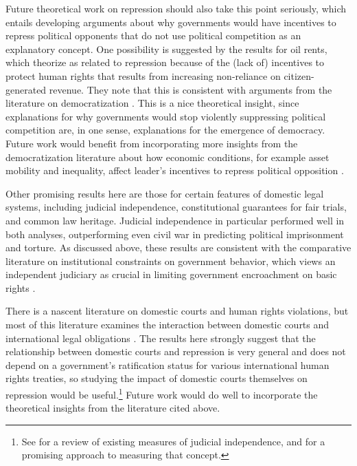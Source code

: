 \documentclass[12pt]{article}
\begin{document}
Future theoretical work on repression should also take this point seriously, which entails developing arguments about why governments would have incentives to repress political opponents that do not use political competition as an explanatory concept. One possibility is suggested by the results for oil rents, which \citet{DemerittYoung2013} theorize as related to repression because of the (lack of) incentives to protect human rights that results from increasing non-reliance on citizen-generated revenue. They note that this is consistent with arguments from the literature on democratization \citep[E.g.][]{Huntington1991,BDMSmith2009}. This is a nice theoretical insight, since explanations for why governments would stop violently suppressing political competition are, in one sense, explanations for the emergence of democracy. Future work would benefit from incorporating more insights from the democratization literature about how economic conditions, for example asset mobility and inequality, affect leader's incentives to repress political opposition \citep[See, e.g.][]{Boix2003,AcemogluRobinson2005,ClarkGolderGolder2013}. 

Other promising results here are those for certain features of domestic legal systems, including judicial independence, constitutional guarantees for fair trials, and common law heritage. Judicial independence in particular performed well in both analyses, outperforming even civil war in predicting political imprisonment and torture. As discussed above, these results are consistent with the comparative literature on institutional constraints on government behavior, which views an independent judiciary as crucial in limiting government encroachment on basic rights \citep[See esp.][]{NorthWeingast1989,Weingast1997,Vanberg2005}. 

There is a nascent literature on domestic courts and human rights violations, but most of this literature examines the interaction between domestic courts and international legal obligations \citep{Hathaway2007,PowellStaton2009,Simmons2009,Conrad2012,ConradRitter2013,Lupu2013}. The results here strongly suggest that the relationship between domestic courts and repression is very general and does not depend on a government's ratification status for various international human rights treaties, so studying the impact of domestic courts themselves on repression would be useful.\footnote{See \citet{RiosStaton2012} for a review of existing measures of judicial independence, and \citet{LinzerStaton2011} for a promising approach to measuring that concept.} Future work would do well to incorporate the theoretical insights from the literature cited above.
\end{document}
